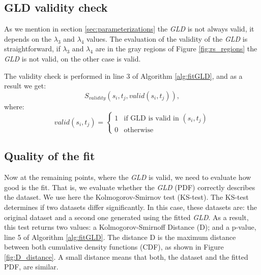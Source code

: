 \subsection{GLD validity check}
As we mention in section \ref{sec:parameterizations} the \textit{GLD} is not always valid, it depends on the $\lambda_{3}$  and $\lambda_{4}$ values. The evaluation of the validity of the \textit{GLD} is straightforward, if $\lambda_{3}$  and $\lambda_{4}$ are in the gray regions of Figure \ref{fig:rs_regions} the \textit{GLD} is not valid, on the other case is valid.

The validity check is performed in line 3 of Algorithm \ref{alg:fitGLD}, and as a result we get:
\begin{equation}
S_{validity}(s_{i},t_{j},valid(s_{i},t_{j})),
\end{equation}
where:
\begin{equation}
 \label{eq:validitycheck}
  valid(s_{i},t_{j}) =
  \begin{cases}
    1 & \text{if GLD is valid in $(s_{i},t_{j})$} \\
    0 & \text{otherwise}
  \end{cases}
\end{equation}

\subsection{Quality of the fit}
\label{Quality of the fit}
Now at the remaining points, where the \textit{GLD} is valid, we need to evaluate how good is the fit. That is, we evaluate whether the \textit{GLD} (PDF) correctly describes the dataset. We use here the Kolmogorov-Smirnov test (KS-test). The KS-test  determines if two datasets differ significantly. In this case, these datasets are: the original dataset and a second one generated using the fitted \textit{GLD}. As a result, this test returns two values: a Kolmogorov-Smirnoff Distance (D); and a p-value, line 5 of Algorithm \ref{alg:fitGLD}. The distance D is the maximum distance between both cumulative density functions (CDF), as shown in Figure \ref{fig:D_distance}. A small distance means that both, the dataset and the fitted PDF, are similar. 


